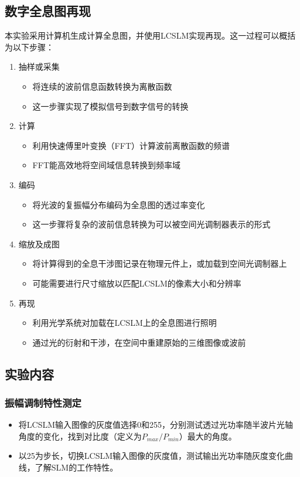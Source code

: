 \documentclass{whureport}
\begin{document}
\begin{multicols}{2}
\subsection{数字全息图再现}
本实验采用计算机生成计算全息图，并使用LCSLM实现再现。这一过程可以概括为以下步骤：
\begin{enumerate}
\item 抽样或采集
\begin{itemize}
\item 将连续的波前信息函数转换为离散函数
\item 这一步骤实现了模拟信号到数字信号的转换
\end{itemize}
\item 计算
\begin{itemize}
\item 利用快速傅里叶变换（FFT）计算波前离散函数的频谱
\item FFT能高效地将空间域信息转换到频率域
\end{itemize}
\item 编码
\begin{itemize}
\item 将光波的复振幅分布编码为全息图的透过率变化
\item 这一步骤将复杂的波前信息转换为可以被空间光调制器表示的形式
\end{itemize}
\item 缩放及成图
\begin{itemize}
\item 将计算得到的全息干涉图记录在物理元件上，或加载到空间光调制器上
\item 可能需要进行尺寸缩放以匹配LCSLM的像素大小和分辨率
\end{itemize}
\item 再现
\begin{itemize}
\item 利用光学系统对加载在LCSLM上的全息图进行照明
\item 通过光的衍射和干涉，在空间中重建原始的三维图像或波前
\end{itemize}
\end{enumerate}
\subsection{实验内容}
\subsubsection{振幅调制特性测定}
\begin{itemize}
\item 将LCSLM输入图像的灰度值选择0和255，分别测试透过光功率随半波片光轴角度的变化，找到对比度（定义为$P_{max}/P_{min}$）最大的角度。
\item 以25为步长，切换LCSLM输入图像的灰度值，测试输出光功率随灰度变化曲线，了解SLM的工作特性。
\end{itemize}

\end{multicols}
\end{document}
